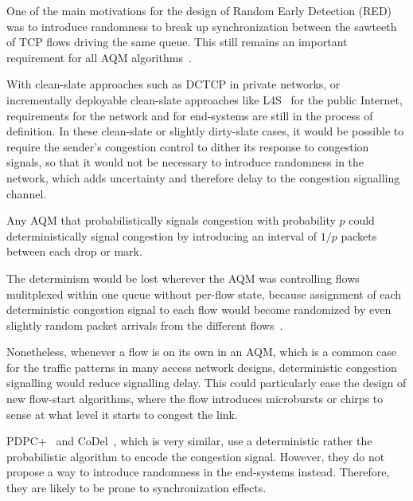 One of the main motivations for the design of Random Early Detection (RED)~\cite{Floyd93:RED} was to introduce randomness to break up synchronization between the sawteeth of TCP flows driving the same queue. This still remains an important requirement for all AQM algorithms~\cite{Baker15:AQM_Recommendations}.

With clean-slate approaches such as DCTCP in private networks, or incrementally deployable clean-slate approaches like L4S~\cite{Briscoe16a:l4s-arch_ID} for the public Internet, requirements for the network and for end-systems are still in the process of definition. In these clean-slate or slightly dirty-slate cases, it would be possible to require the sender's congestion control to dither its response to congestion signals, so that it would not be necessary to introduce randomness in the network, which adds uncertainty and therefore delay to the congestion signalling channel. 

Any AQM that probabilistically signals congestion with probability \(p\) could deterministically signal congestion by introducing an interval of \(1/p\) packets between each drop or mark. 

The determinism would be lost wherever the AQM was controlling flows mulitplexed within one queue without per-flow state, because assignment of each deterministic congestion signal to each flow would become randomized by even slightly random packet arrivals from the different flows~\cite{Briscoe15d:PIE_rvw}.

Nonetheless, whenever a flow is on its own in an AQM, which is a common case for the traffic patterns in many access network designs,  deterministic congestion signalling would reduce signalling delay. This could particularly ease the design of new flow-start algorithms, where the flow introduces microbursts or chirps to sense at what level it starts to congest the link.


PDPC+~\cite{Sagfors03:PDPC_vary} and CoDel~\cite{Nichols12:CoDel}, which is very similar, use a deterministic rather the probabilistic algorithm to encode the congestion signal. However, they do not propose a way to introduce randomness in the end-systems instead. Therefore, they are likely to be prone to synchronization effects.
